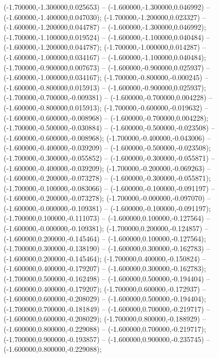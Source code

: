  (-1.700000,-1.300000,0.025653) -- (-1.600000,-1.300000,0.046992) -- (-1.600000,-1.400000,0.047030);
 (-1.700000,-1.200000,0.023327) -- (-1.600000,-1.200000,0.044787) -- (-1.600000,-1.300000,0.046992);
 (-1.700000,-1.100000,0.019524) -- (-1.600000,-1.100000,0.040484) -- (-1.600000,-1.200000,0.044787);
 (-1.700000,-1.000000,0.014287) -- (-1.600000,-1.000000,0.034167) -- (-1.600000,-1.100000,0.040484);
 (-1.700000,-0.900000,0.007673) -- (-1.600000,-0.900000,0.025937) -- (-1.600000,-1.000000,0.034167);
 (-1.700000,-0.800000,-0.000245) -- (-1.600000,-0.800000,0.015913) -- (-1.600000,-0.900000,0.025937);
 (-1.700000,-0.700000,-0.009381) -- (-1.600000,-0.700000,0.004228) -- (-1.600000,-0.800000,0.015913);
 (-1.700000,-0.600000,-0.019632) -- (-1.600000,-0.600000,-0.008968) -- (-1.600000,-0.700000,0.004228);
 (-1.700000,-0.500000,-0.030884) -- (-1.600000,-0.500000,-0.023508) -- (-1.600000,-0.600000,-0.008968);
 (-1.700000,-0.400000,-0.043006) -- (-1.600000,-0.400000,-0.039209) -- (-1.600000,-0.500000,-0.023508);
 (-1.700000,-0.300000,-0.055852) -- (-1.600000,-0.300000,-0.055871) -- (-1.600000,-0.400000,-0.039209);
 (-1.700000,-0.200000,-0.069263) -- (-1.600000,-0.200000,-0.073278) -- (-1.600000,-0.300000,-0.055871);
 (-1.700000,-0.100000,-0.083066) -- (-1.600000,-0.100000,-0.091197) -- (-1.600000,-0.200000,-0.073278);
 (-1.700000,-0.000000,-0.097070) -- (-1.600000,-0.000000,-0.109381) -- (-1.600000,-0.100000,-0.091197);
 (-1.700000,0.100000,-0.111073) -- (-1.600000,0.100000,-0.127564) -- (-1.600000,-0.000000,-0.109381);
 (-1.700000,0.200000,-0.124857) -- (-1.600000,0.200000,-0.145464) -- (-1.600000,0.100000,-0.127564);
 (-1.700000,0.300000,-0.138190) -- (-1.600000,0.300000,-0.162783) -- (-1.600000,0.200000,-0.145464);
 (-1.700000,0.400000,-0.150824) -- (-1.600000,0.400000,-0.179207) -- (-1.600000,0.300000,-0.162783);
 (-1.700000,0.500000,-0.162498) -- (-1.600000,0.500000,-0.194404) -- (-1.600000,0.400000,-0.179207);
 (-1.700000,0.600000,-0.172937) -- (-1.600000,0.600000,-0.208029) -- (-1.600000,0.500000,-0.194404);
 (-1.700000,0.700000,-0.181849) -- (-1.600000,0.700000,-0.219717) -- (-1.600000,0.600000,-0.208029);
 (-1.700000,0.800000,-0.188929) -- (-1.600000,0.800000,-0.229088) -- (-1.600000,0.700000,-0.219717);
 (-1.700000,0.900000,-0.193857) -- (-1.600000,0.900000,-0.235745) -- (-1.600000,0.800000,-0.229088);
